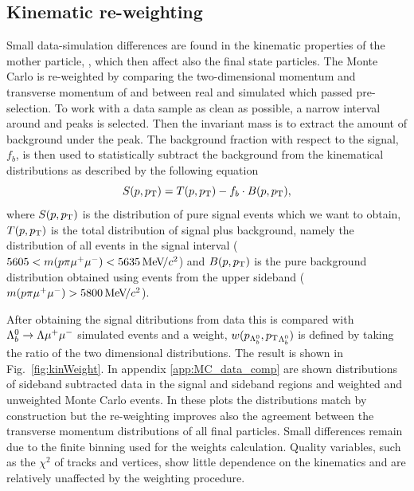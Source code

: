\subsection{Kinematic re-weighting}
\label{sec:kinWeight}

Small data-simulation differences are found in the kinematic properties of the mother particle, \Lb,
which then affect also the final state particles. The Monte Carlo is re-weighted by 
comparing the two-dimensional momentum and transverse momentum of \Lb and \Lz between
real and simulated \Lb\to\jpsi\Lz which passed pre-selection.
To work with a data sample as clean as possible, a narrow interval around \jpsi and \Lb peaks is selected.
Then the \Lb invariant mass is to extract the amount of background under the peak.
The background fraction with respect to the signal, $f_b$, is then used to statistically
subtract the background from the kinematical distributions as described by the following equation
%
\begin{equation}
S(p,\mbox{$p_{\rm T}$}) = T(p,\mbox{$p_{\rm T}$}) - f_b\cdot B(p,\mbox{$p_{\rm T}$}),
\end{equation}
\noindent
where $S(p,\mbox{$p_{\rm T}$})$ is the distribution of pure signal events which we want to obtain, $T(p,\mbox{$p_{\rm T}$})$ is the total
distribution of signal plus background, namely the distribution of all events in the signal interval
($5605 < m(p\pi\mumu) < 5635 \mevcc$) and $B(p,\mbox{$p_{\rm T}$})$ is the pure background
distribution obtained using events from the upper sideband ($m(p\pi\mumu) > 5800 \mevcc$).

After obtaining the signal ditributions from data this is compared with ${{\Lambda}^0_{b}}\rightarrow{\ensuremath{\Lambda}}{\ensuremath{\mu^+\mu^-}}$ simulated events
and a weight, $w(p_{{{\Lambda}^0_{b}}},\mbox{$p_{\rm T}$}_{{{\Lambda}^0_{b}}})$ is defined by taking the ratio of the two dimensional distributions.
The result is shown in Fig.~\ref{fig:kinWeight}. In appendix \ref{app:MC_data_comp} are shown distributions
of sideband subtracted data in the signal and sideband regions and weighted and unweighted Monte Carlo events.
In these plots the \Lb distributions match by construction but the re-weighting improves also the agreement 
between the transverse momentum distributions of all final particles. Small differences remain due to
the finite binning used for the weights calculation. Quality variables, such as the $\chi^2$ of tracks
and vertices, show little dependence on the kinematics and are relatively unaffected by the weighting procedure.

